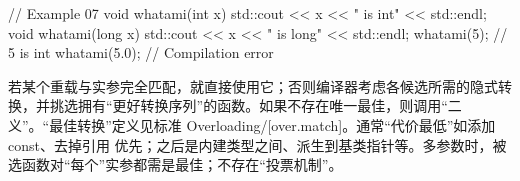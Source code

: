 \begin{code}
// Example 07
void whatami(int x) {
  std::cout << x << " is int" << std::endl;
}
void whatami(long x) {
  std::cout << x << " is long" << std::endl;
}
whatami(5);    // 5 is int
whatami(5.0);    // Compilation error
\end{code}

若某个重载与实参完全匹配，就直接使用它；否则编译器考虑各候选所需的隐式转换，并挑选拥有“更好转换序列”的函数。如果不存在唯一最佳，则调用“二义”。“最佳转换”定义见标准 Overloading/[over.match]。通常“代价最低”如添加 const、去掉引用 优先；之后是内建类型之间、派生到基类指针等。多参数时，被选函数对“每个”实参都需是最佳；不存在“投票机制”。

